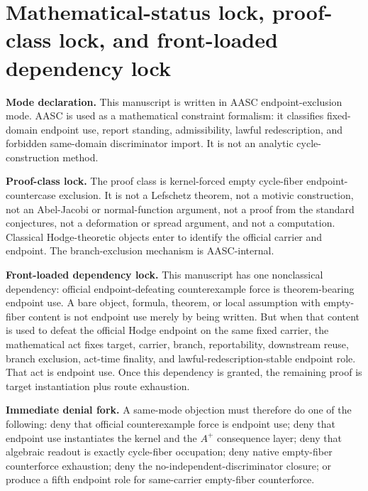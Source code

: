 \documentclass[11pt]{article}
\begin{document}
\section{Mathematical-status lock, proof-class lock, and front-loaded dependency lock}


\par\noindent\textbf{Mode declaration.} This manuscript is written in AASC endpoint-exclusion mode. AASC is used as a mathematical constraint formalism: it classifies fixed-domain endpoint use, report standing, admissibility, lawful redescription, and forbidden same-domain discriminator import. It is not an analytic cycle-construction method.

\par\noindent\textbf{Proof-class lock.} The proof class is kernel-forced empty cycle-fiber endpoint-countercase exclusion. It is not a Lefschetz theorem, not a motivic construction, not an Abel-Jacobi or normal-function argument, not a proof from the standard conjectures, not a deformation or spread argument, and not a computation. Classical Hodge-theoretic objects enter to identify the official carrier and endpoint. The branch-exclusion mechanism is AASC-internal.

\par\noindent\textbf{Front-loaded dependency lock.} This manuscript has one nonclassical dependency: official endpoint-defeating counterexample force is theorem-bearing endpoint use. A bare object, formula, theorem, or local assumption with empty-fiber content is not endpoint use merely by being written. But when that content is used to defeat the official Hodge endpoint on the same fixed carrier, the mathematical act fixes target, carrier, branch, reportability, downstream reuse, branch exclusion, act-time finality, and lawful-redescription-stable endpoint role. That act is endpoint use. Once this dependency is granted, the remaining proof is target instantiation plus route exhaustion.

\par\noindent\textbf{Immediate denial fork.} A same-mode objection must therefore do one of the following: deny that official counterexample force is endpoint use; deny that endpoint use instantiates the kernel and the $A^+$ consequence layer; deny that algebraic readout is exactly cycle-fiber occupation; deny native empty-fiber counterforce exhaustion; deny the no-independent-discriminator closure; or produce a fifth endpoint role for same-carrier empty-fiber counterforce.
\end{document}
